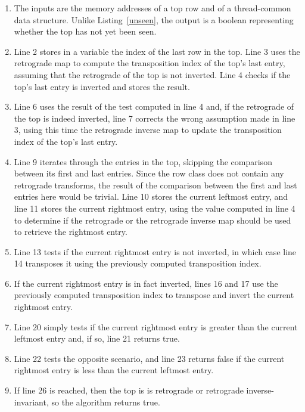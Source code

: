 \begin{enumerate}
\item The inputs are the memory addresses of a top row and of a thread-common data structure. Unlike Listing~\ref{unseen}, the output is a boolean representing whether the top has not yet been seen.
\item Line 2 stores in a variable the index of the last row in the top. Line 3 uses the retrograde map to compute the transposition index of the top's last entry, assuming that the retrograde of the top is not inverted. Line 4 checks if the top's last entry is inverted and stores the result.
\addtocounter{enumi}{3}
\item Line 6 uses the result of the test computed in line 4 and, if the retrograde of the top is indeed inverted, line 7 corrects the wrong assumption made in line 3, using this time the retrograde inverse map to update the transposition index of the top's last entry.
\addtocounter{enumi}{2}
\item Line 9 iterates through the entries in the top, skipping the comparison between its first and last entries. Since the row class does not contain any retrograde transforms, the result of the comparison between the first and last entries here would be trivial. Line 10 stores the current leftmost entry, and line 11 stores the current rightmost entry, using the value computed in line 4 to determine if the retrograde or the retrograde inverse map should be used to retrieve the rightmost entry.
\addtocounter{enumi}{3}
\item Line 13 tests if the current rightmost entry is not inverted, in which case line 14 transposes it using the previously computed transposition index.
\addtocounter{enumi}{2}
\item If the current rightmost entry is in fact inverted, lines 16 and 17 use the previously computed transposition index to transpose and invert the current rightmost entry.
\addtocounter{enumi}{3}
\item Line 20 simply tests if the current rightmost entry is greater than the current leftmost entry and, if so, line 21 returns true.
\addtocounter{enumi}{1}
\item Line 22 tests the opposite scenario, and line 23 returns false if the current rightmost entry is less than the current leftmost entry.
\addtocounter{enumi}{3}
\item If line 26 is reached, then the top is is retrograde or retrograde inverse-invariant, so the algorithm returns true.
\end{enumerate}

